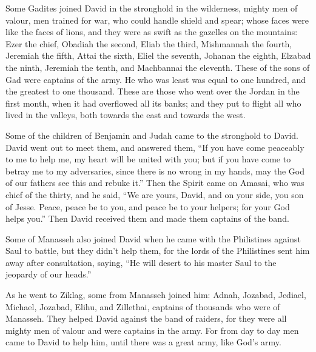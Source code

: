 Some Gadites joined David in the stronghold in the
wilderness, mighty men of valour, men trained for war, who could handle
shield and spear; whose faces were like the faces of lions, and they
were as swift as the gazelles on the mountains:  Ezer the
chief, Obadiah the second, Eliab the third,  Mishmannah
the fourth, Jeremiah the fifth,  Attai the sixth, Eliel
the seventh,  Johanan the eighth, Elzabad the ninth,
 Jeremiah the tenth, and Machbannai the eleventh.
 These of the sons of Gad were captains of the army. He
who was least was equal to one hundred, and the greatest to one
thousand.  These are those who went over the Jordan in
the first month, when it had overflowed all its banks; and they put to
flight all who lived in the valleys, both towards the east and towards
the west.

 Some of the children of Benjamin and Judah came to the
stronghold to David.  David went out to meet them, and
answered them, ``If you have come peaceably to me to help me, my heart
will be united with you; but if you have come to betray me to my
adversaries, since there is no wrong in my hands, may the God of our
fathers see this and rebuke it.''  Then the Spirit came
on Amasai, who was chief of the thirty, and he said, ``We are yours,
David, and on your side, you son of Jesse. Peace, peace be to you, and
peace be to your helpers; for your God helps you.'' Then David received
them and made them captains of the band.

 Some of Manasseh also joined David when he came with the
Philistines against Saul to battle, but they didn't help them, for the
lords of the Philistines sent him away after consultation, saying, ``He
will desert to his master Saul to the jeopardy of our heads.''

 As he went to Ziklag, some from Manasseh joined him:
Adnah, Jozabad, Jediael, Michael, Jozabad, Elihu, and Zillethai,
captains of thousands who were of Manasseh.  They helped
David against the band of raiders, for they were all mighty men of
valour and were captains in the army.  For from day to
day men came to David to help him, until there was a great army, like
God's army.

